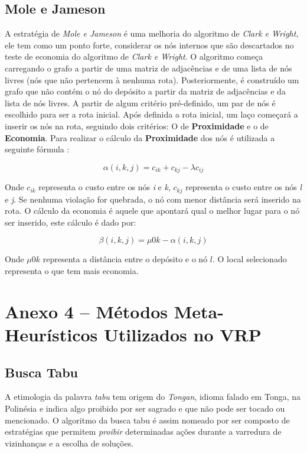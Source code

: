 \subsection*{Mole e Jameson}

A estratégia de \emph{Mole e Jameson} é uma melhoria do algoritmo de \emph{Clark e Wright}, ele tem como um ponto forte, considerar os nós internos que são descartados no teste de economia do algoritmo de \emph{Clark e Wright}. O algoritmo começa carregando o grafo a partir de uma matriz de adjacências e de uma lista de nós livres (nós que não pertencem à nenhuma rota). Posteriormente, é construído um grafo que não contém o nó do depósito a partir da matriz de adjacências e da lista de nós livres. A partir de algum critério pré-definido, um par de nós é escolhido para ser a rota inicial. Após definida a rota inicial, um laço começará a inserir os nós na rota, seguindo dois critérios: O de \textbf{Proximidade} e o de \textbf{Economia}.
Para realizar o cálculo da \textbf{Proximidade} dos nós é utilizada a seguinte fórmula \cite[p. 33]{maxwell}:

\[\alpha(i, k, j) = c_{ik} + c_{kj} - \lambda c_{ij} \]

Onde $c_{ik}$ representa o custo entre os nós \emph{i} e \emph{k}, $c_{kj}$  representa o custo entre os nós \emph{l} e \emph{j}. Se nenhuma violação for quebrada, o nó com menor distância será inserido na rota. O cálculo da economia é aquele que apontará qual o melhor lugar para o nó ser inserido, este cálculo é dado por:

\[\beta(i, k, j) = \mu 0k - \alpha(i, k, j) \]


Onde \(\mu 0k\) representa a distância entre o depósito e o nó $l$. O local selecionado representa o que tem mais economia.

\section*{Anexo 4 -- Métodos Meta-Heurísticos Utilizados no VRP}

\subsection*{Busca Tabu}

A etimologia da palavra \emph{tabu} tem origem do \emph{Tongan}, idioma falado em Tonga, na Polinésia e indica algo proibido por ser sagrado e que não pode ser tocado ou mencionado. O algoritmo da busca tabu é assim nomeado por ser composto de estratégias que permitem \emph{proibir} determinadas ações durante a varredura de vizinhanças e a escolha de soluções.

